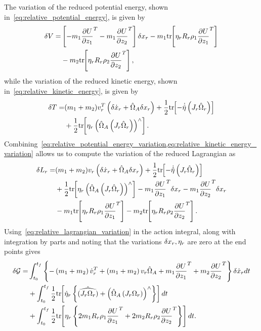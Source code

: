 The variation of the reduced potential energy, shown in~\cref{eq:relative_potential_energy}, is given by
\begin{align}\label{eq:relative_potential_energy_variation}
    \delta V =& \left[ -m_1 \frac{\partial U}{\partial z_1}^T - m_1 \frac{\partial U}{\partial z_2}^T \right] \delta x_r - m_1 \mathrm{tr}\negthickspace\left[  \eta_r R_r \rho_1 \frac{\partial U}{\partial z_1}^T \right] \nonumber\\
              & {} - m_2 \mathrm{tr}\negthickspace\left[ \eta_r R_r \rho_2 \frac{\partial U}{\partial z_2}^T \right],
\end{align}
while the variation of the reduced kinetic energy, shown in~\cref{eq:relative_kinetic_energy}, is given by
\begin{align}\label{eq:relative_kinetic_energy_variation}
    \delta T =& (m_1 + m_2) v_r^T \left( \delta \dot{x}_r +  \hat{\Omega}_A \delta x_r \right) + \frac{1}{2} \mathrm{tr}\negthickspace\left[  -\dot{\hat{\eta}}\left( J_r  \hat{\Omega}_r  \right) \right] \nonumber\\
              & {} +\frac{1}{2} \mathrm{tr}\negthickspace\left[ \eta_r \left(  \hat{\Omega}_A\left( J_r  \hat{\Omega}_r \right) \right)^\wedge \right].
\end{align}
Combining~\cref{eq:relative_potential_energy_variation,eq:relative_kinetic_energy_variation} allows us to compute the variation of the reduced Lagrangian as
\begin{align}\label{eq:relative_lagrangian_variation}
    \delta L_r =& (m_1 + m_2) v_r \left( \delta \dot{x}_r +  \hat{\Omega}_A \delta x_r \right) + \frac{1}{2} \mathrm{tr}\negthickspace\left[  -\dot{\hat{\eta}}\left( J_r  \hat{\Omega}_r  \right) \right] \nonumber\\
                & {} +\frac{1}{2} \mathrm{tr}\negthickspace\left[ \eta_r \left(  \hat{\Omega}_A\left( J_r  \hat{\Omega}_r \right) \right)^\wedge \right] -m_1 \frac{\partial U}{\partial z_1}^T \delta x_r - m_1 \frac{\partial U}{\partial z_2}^T \delta x_r \nonumber\\
                & {} - m_1 \mathrm{tr}\negthickspace\left[  \eta_r  R_r \rho_1 \frac{\partial U}{\partial z_1}^T \right] - m_2 \mathrm{tr}\negthickspace\left[ \eta_r  R_r \rho_2 \frac{\partial U}{\partial z_2}^T \right].
\end{align}
Using~\cref{eq:relative_lagrangian_variation} in the action integral, along with integration by parts and noting that the variations \( \delta x_r, \eta_r\) are zero at the end points gives 
\begin{align}\label{eq:relative_hamiltons_principle}
    \delta \mathcal{G} =& \int_{t_0}^{t_f} \left\{-\left( m_1+m_2 \right) \dot{v}_r^T + \left( m_1 + m_2 \right) v_r \hat{\Omega}_A + m_1 \frac{\partial U}{\partial z_1}^T + m_2 \frac{\partial U}{\partial z_2}^T \right\}\delta \dot{x}_r  dt \nonumber\\
                        & {} +\int_{t_0}^{t_f} \frac{1}{2} \mathrm{tr}\negthickspace\left[ \dot{\eta}_r \left\{ \dot{\widehat{\left( J_r \Omega_r \right)}} + \left( \hat{\Omega}_A \left( J_r \Omega_r \right) \right)^\wedge  \right\} \right] dt \nonumber\\
                        & {} + \int_{t_0}^{t_f}  \frac{1}{2} \mathrm{tr}\negthickspace\left[ \eta_r  \left\{ 2 m_1R_r \rho_1\frac{\partial U}{\partial z_1}^T + 2 m_2 R_r \rho_2\frac{\partial U}{\partial z_2}^T \right\} \right] dt.
\end{align}
